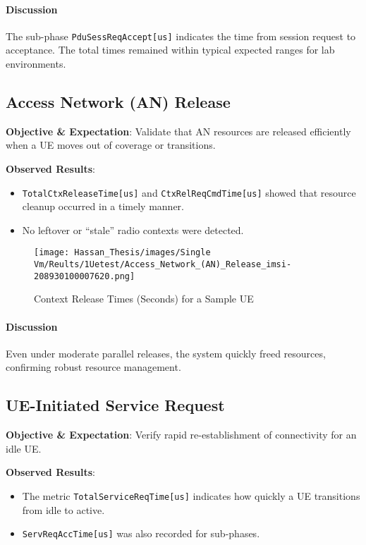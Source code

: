 \paragraph{Discussion}
The sub-phase \texttt{PduSessReqAccept[us]} indicates the time from session request to acceptance. The total times remained within typical expected ranges for lab environments.

\subsection{Access Network (AN) Release}
\textbf{Objective \& Expectation}: Validate that AN resources are released efficiently when a UE moves out of coverage or transitions.

\noindent \textbf{Observed Results}:
\begin{itemize}
    \item \texttt{TotalCtxReleaseTime[us]} and \texttt{CtxRelReqCmdTime[us]} showed that resource cleanup occurred in a timely manner.
    \item No leftover or “stale” radio contexts were detected.
\end{itemize}

\begin{figure}[H]
\centering
\caption{Context Release Times (Seconds) for a Sample UE}
\label{fig:ctx-rel-times-sample-ue}
\texttt{[image: Hassan\_Thesis/images/Single Vm/Reults/1Uetest/Access\_Network\_(AN)\_Release\_imsi-208930100007620.png]}
\end{figure}

\paragraph{Discussion}
Even under moderate parallel releases, the system quickly freed resources, confirming robust resource management.

\subsection{UE-Initiated Service Request}
\textbf{Objective \& Expectation}: Verify rapid re-establishment of connectivity for an idle UE.

\noindent \textbf{Observed Results}:
\begin{itemize}
    \item The metric \texttt{TotalServiceReqTime[us]} indicates how quickly a UE transitions from idle to active.
    \item \texttt{ServReqAccTime[us]} was also recorded for sub-phases.
\end{itemize}

